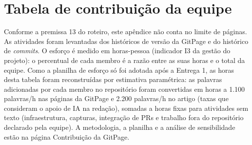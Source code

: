 \appendices
\section{Tabela de contribuição da equipe}
\label{ap:contribuicao}

Conforme a premissa 13 do roteiro, este apêndice não conta no limite de páginas. As atividades foram levantadas dos históricos de versão da GitPage e do histórico de \textit{commits}. O esforço é medido em horas-pessoa (indicador I3 da gestão do projeto): o percentual de cada membro é a razão entre as suas horas e o total da equipe. Como a planilha de esforço só foi adotada após a Entrega 1, as horas desta tabela foram reconstruídas por estimativa paramétrica: as palavras adicionadas por cada membro no repositório foram convertidas em horas a 1.100 palavras/h nas páginas da GitPage e 2.200 palavras/h no artigo (taxas que consideram o apoio de IA na redação), somadas a horas fixas para atividades sem texto (infraestrutura, capturas, integração de PRs e trabalho fora do repositório declarado pela equipe). A metodologia, a planilha e a análise de sensibilidade estão na página Contribuição da GitPage.

